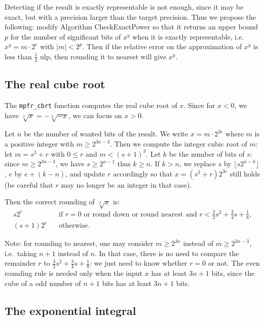 \documentclass[12pt]{amsart}
\begin{document}
Detecting if the result is exactly representable is not enough, since it
may be exact, but with a precision larger than the target precision.
Thus we propose the following: modify Algorithm CheckExactPower so that
it returns an upper bound $p$ for the number of significant bits
of $x^y$ when it is exactly representable, i.e.\ $x^y = m \cdot 2^e$
with $|m| < 2^p$. Then if the relative error on the approximation of
$x^y$ is less than $\frac{1}{2}$ ulp, then rounding it to nearest will give
$x^y$.

\subsection{The real cube root}

The \texttt{mpfr\_cbrt} function computes the real cube root of $x$.
Since for $x<0$, we have $\sqrt[3]{x} = - \sqrt[3]{-x}$, we can focus
on $x > 0$.

Let $n$ be the number of wanted bits of the result.
We write $x = m \cdot 2^{3e}$ where $m$ is a positive integer
with $m \geq 2^{3n-3}$.
Then we compute the integer cubic root of $m$: let $m=s^3+r$ with
$0 \leq r$ and $m < (s+1)^3$.
Let $k$ be the number of bits of $s$: since $m \geq 2^{3n-3}$,
we have $s \geq 2^{n-1}$ thus $k \geq n$.
If $k > n$, we replace $s$ by $\lfloor s 2^{n-k} \rfloor$,
$e$ by $e+(k-n)$,
and update $r$ accordingly so that $x = (s^3+r) 2^{3e}$ still holds
(be careful that $r$ may no longer be an integer in that case).

Then the correct rounding of $\sqrt[3]{x}$ is:
\begin{eqnarray*}
s 2^e && \mbox{if $r=0$ or round down or round nearest and
        $r < \frac{3}{2} s^2 +\frac{3}{4}s+ \frac{1}{8}$,} \\
(s+1) 2^e && \mbox{otherwise}.
\end{eqnarray*}

Note: for rounding to nearest, one may consider $m \geq 2^{3n}$ instead of
$m \geq 2^{3n-3}$, i.e.\ taking $n+1$ instead of $n$.
In that case, there is no need to compare the remainder $r$ to
$\frac{3}{2} s^2 +\frac{3}{4}s+ \frac{1}{8}$: we just need to know
whether $r=0$ or not.
The even rounding rule is needed only when the input $x$ has at least
$3n+1$ bits, since the cube of a odd number of $n+1$ bits has at least
$3n+1$ bits.

\subsection{The exponential integral}
\end{document}
